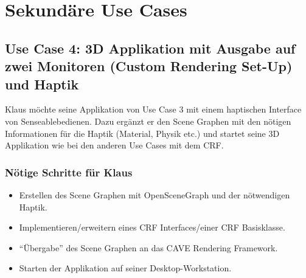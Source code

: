 \section{Sekund\"are Use Cases}

\subsection{Use Case 4: 3D Applikation mit Ausgabe auf zwei Monitoren (Custom Rendering Set-Up) und Haptik}

Klaus m\"ochte seine Applikation von Use Case 3 mit einem haptischen Interface von Senseable\texttrademark bedienen. Dazu erg\"anzt er den Scene Graphen mit den n\"otigen Informationen f\"ur die Haptik (Material, Physik etc.) und startet seine 3D Applikation wie bei den anderen Use Cases mit dem CRF.

\subsubsection{N\"otige Schritte f\"ur Klaus}

\begin{itemize}
	\item Erstellen des Scene Graphen mit OpenSceneGraph und der n\"otwendigen Haptik.
	\item Implementieren/erweitern eines CRF Interfaces/einer CRF Basisklasse.
	\item "`\"Ubergabe"' des Scene Graphen an das CAVE Rendering Framework.
	\item Starten der Applikation auf seiner Desktop-Workstation.
\end{itemize}


